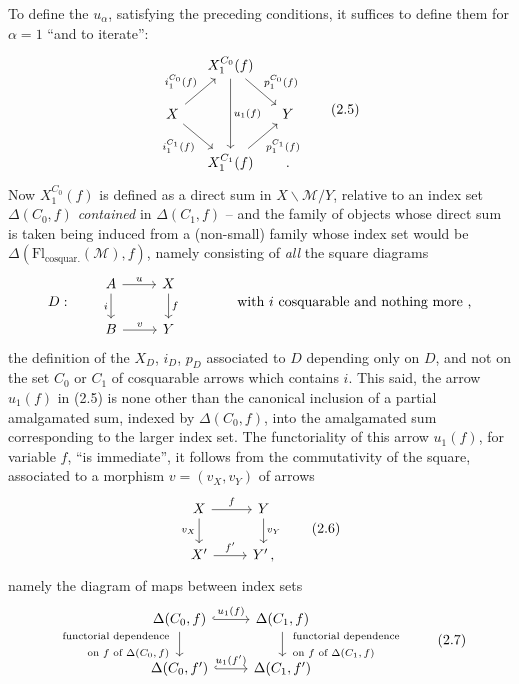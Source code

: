 \documentclass[11pt]{article}
\newcommand{\printedpage}[1]{\marginpar{\footnotesize p.~#1}}
\newcommand{\msp}[1]{\marginpar{\footnotesize [#1]}}
\newcommand{\Fl}{\mathrm{Fl}}
\newcommand{\cM}{\mathcal{M}}
\begin{document}
\msp{page 14}

To define the $u_\alpha$, satisfying the preceding conditions, it suffices to define them for $\alpha=1$ ``and to iterate'':
\[
\begin{tikzcd}[column sep=small]
& X_1^{C_0}(f) \arrow[dd, "u_1(f)"] \arrow[dr, "p_1^{C_0}(f)"] & \\
X \arrow[ur, "i_1^{C_0}(f)"] \arrow[dr, "i_1^{C_1}(f)"'] & & Y \\
& X_1^{C_1}(f) \arrow[ur, "p_1^{C_1}(f)"'] & {}.
\end{tikzcd}
\tag*{(2.5)}
\]
Now $X_1^{C_0}(f)$ is defined as a direct sum in $X\backslash\cM/Y$, relative to an index set $\Delta(C_0,f)$ \textit{contained} in $\Delta(C_1,f)$ -- and the family of objects whose direct sum is taken being induced from a (non-small) family whose index set would be $\Delta(\Fl_{\text{cosquar.}}(\cM),f)$, namely consisting of \textit{all} the square diagrams
\printedpage{11}
\[
D : \qquad
\begin{tikzcd}
A \arrow[r, "u"] \arrow[d, "i"'] & X \arrow[d, "f"] \\
B \arrow[r, "v"] & Y
\end{tikzcd}
\qquad\qquad \text{with $i$ cosquarable and nothing more ,}
\]
the definition of the $X_D$, $i_D$, $p_D$ associated to $D$ depending only on $D$, and not on the set $C_0$ or $C_1$ of cosquarable arrows which contains $i$. This said, the arrow $u_1(f)$
\msp{page 15}
in (2.5) is none other than the canonical inclusion of a partial amalgamated sum, indexed by $\Delta(C_0,f)$, into the amalgamated sum corresponding to the larger index set. The functoriality of this arrow $u_1(f)$, for variable $f$, ``is immediate'', it follows from the commutativity of the square, associated to a morphism $v=(v_X,v_Y)$ of arrows
\[
\begin{tikzcd}
X \arrow[r, "f"] \arrow[d, "v_X"'] & Y \arrow[d, "v_Y"] \\
X' \arrow[r, "f'"] & Y'\,,
\end{tikzcd}
\tag*{(2.6)}
\]
namely the diagram of maps between index sets
\[
\begin{tikzcd}
\Delta(C_0,f) \arrow[r, hook, "u_1(f)"] \arrow[d, "{\begin{array}{r}\text{functorial dependence}\\ \text{on $f$ of $\Delta(C_0,f)$}\end{array}}"'] & \Delta(C_1,f) \arrow[d, "{\begin{array}{l}\text{functorial dependence}\\ \text{on $f$ of $\Delta(C_1,f)$}\end{array}}"] \\
\Delta(C_0,f') \arrow[r, hook, "u_1(f')"] & \Delta(C_1,f')
\end{tikzcd}
\tag*{(2.7)}
\]
\end{document}
